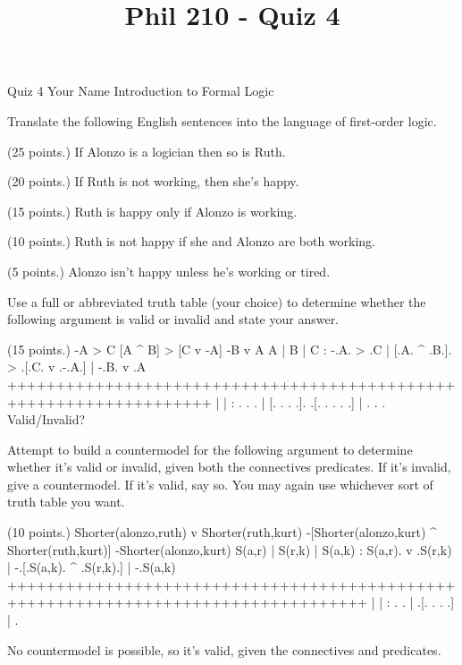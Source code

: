 
\title{Phil 210 - Quiz 4}

\heading
Quiz 4
Your Name
Introduction to Formal Logic
\endheading

Translate the following English sentences into the language of first-order logic.

\problems
{} (25 points.)
If Alonzo is a logician then so is Ruth.
        \answer
        $ $
        \endanswer

 (20 points.)
If Ruth is not working, then she's happy.
        \answer
        $ $
        \endanswer

 (15 points.)
Ruth is happy only if Alonzo is working.
        \answer
        $ $
        \endanswer

 (10 points.)
Ruth is not happy if she and Alonzo are both working.
        \answer
        $ $
        \endanswer

 (5 points.)
Alonzo isn't happy unless he's working or tired.
        \answer
        $ $
        \endanswer

\endproblems

Use a full or abbreviated truth table (your choice) to determine whether the following argument is valid or invalid and state your answer.

\problems
{} (15 points.)
\argument
 -A > C
 [A ^ B] > [C v -A]
\argumentline
 -B v A
\endargument
        \answer
        \truthtable
         A | B | C : -.A. > .C | [.A. ^ .B.]. > .[.C. v .-.A.] | -.B. v .A
        +++++++++++++++++++++++++++++++++++++++++++++++++++++++++++++++++++
           |   |   :  . .   .  | [. .   . .].   .[. .   . . .] |  . .   .
        \endtruthtable
        Valid/Invalid?
        \endanswer

\endproblems

Attempt to build a countermodel for the following argument to determine whether it's valid or invalid, given both the connectives predicates. If it's invalid, give a countermodel. If it's valid, say so. You may again use whichever sort of truth table you want.

\problems
{} (10 points.)
\argument
 Shorter(alonzo,ruth) v Shorter(ruth,kurt)
 -[Shorter(alonzo,kurt) ^ Shorter(ruth,kurt)]
\argumentline
 -Shorter(alonzo,kurt)
\endargument
        \answer
        \truthtable
         S(a,r) | S(r,k) | S(a,k) : S(a,r). v .S(r,k) | -.[.S(a,k). ^ .S(r,k).] | -.S(a,k)
        +++++++++++++++++++++++++++++++++++++++++++++++++++++++++++++++++++++++++++++++++++
                |        |        :       .   .       |  .[.      .   .      .] |  .
        \endtruthtable

        \heightmodel
         
        \endheightmodel
        \OR
        No countermodel is possible, so it's valid, given the connectives and predicates.
        \endanswer

\endproblems
\bye
